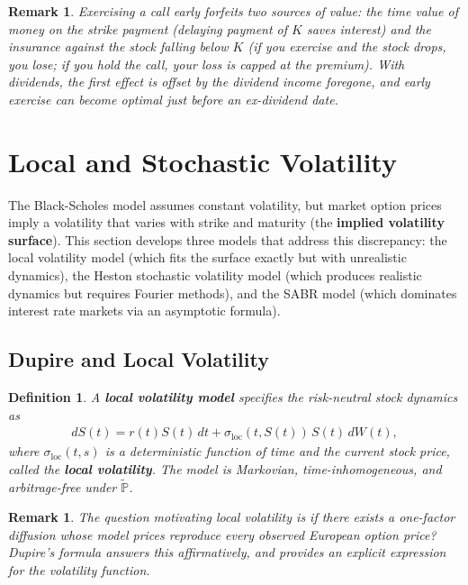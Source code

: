 \documentclass{report}
\theoremstyle{spacedplain}
\theoremstyle{spaceddefinition}
\newtheorem{definition}[theorem]{Definition}
\theoremstyle{spacedremark}
\newtheorem{remark}[theorem]{Remark}
\begin{document}
\begin{remark}
Exercising a call early forfeits two sources of value: the time value of money on the strike payment (delaying payment of $K$ saves interest) and the insurance against the stock falling below $K$ (if you exercise and the stock drops, you lose; if you hold the call, your loss is capped at the premium). With dividends, the first effect is offset by the dividend income foregone, and early exercise can become optimal just before an ex-dividend date.
\end{remark}


\section{Local and Stochastic Volatility}

The Black-Scholes model assumes constant volatility, but market option prices imply a volatility that varies with strike and maturity (the \textbf{implied volatility surface}). This section develops three models that address this discrepancy: the local volatility model (which fits the surface exactly but with unrealistic dynamics), the Heston stochastic volatility model (which produces realistic dynamics but requires Fourier methods), and the SABR model (which dominates interest rate markets via an asymptotic formula).

\subsection{Dupire and Local Volatility}

\begin{definition}
A \textbf{local volatility model} specifies the risk-neutral stock dynamics as
\begin{align}
    dS(t) = r(t)S(t)\,dt + \sigma_{\text{loc}}(t, S(t))\,S(t)\,dW(t),
\end{align}
where $\sigma_{\text{loc}}(t,s)$ is a deterministic function of time and the current stock price, called the \textbf{local volatility}. The model is Markovian, time-inhomogeneous, and arbitrage-free under $\widetilde{\mathbb{P}}$.
\end{definition}

\begin{remark}
The question motivating local volatility is if there exists a one-factor diffusion whose model prices reproduce every observed European option price? Dupire's formula answers this affirmatively, and provides an explicit expression for the volatility function.
\end{remark}
\end{document}
